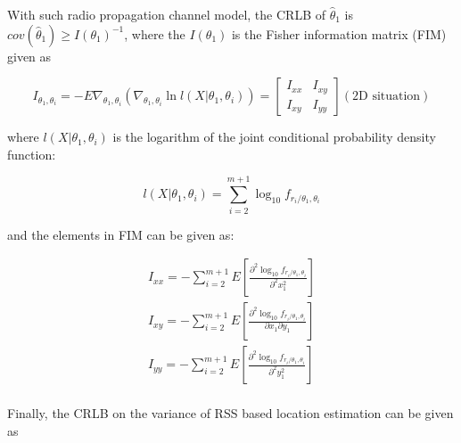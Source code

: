 \documentclass[12pt]{report}
\begin{document}
With such radio propagation channel model, the CRLB of $\hat{\theta}_1$ is $cov(\hat{\theta}_1) \geq I(\theta_1)^{-1}$, where the $I(\theta_1)$ is the Fisher information matrix (FIM) given as 

\begin{equation}
I_{\theta_1, \theta_i} = -E\nabla_{\theta_1, \theta_i}(\nabla_{\theta_1, \theta_i} \ln l (X|\theta_1,\theta_i)) = 
\begin{bmatrix}
I_{xx} & I_{xy} \\
I_{xy} & I_{yy}
\end{bmatrix}
(\textrm{2D situation})
\end{equation}

where $l(X|\theta_1,\theta_i)$ is the logarithm of the joint conditional probability density function:

\begin{equation}
l(X|\theta_1,\theta_i) = \sum^{m+1}_{i = 2} \log_{10} f_{r_i/ \theta_1,\theta_i}
\end{equation}

and the elements in FIM can be given as:

\begin{equation}
\begin{matrix}
I_{xx} = -\sum^{m+1}_{i=2} E[\frac{\partial^2 \log_{10} f_{r_i/ \theta_1,\theta_i} }{\partial^2 x^2_1}] \\
I_{xy} = -\sum^{m+1}_{i=2} E[\frac{\partial^2 \log_{10} f_{r_i/ \theta_1,\theta_i} }{\partial x_1 \partial y_1}] \\
I_{yy} = -\sum^{m+1}_{i=2} E[\frac{\partial^2 \log_{10} f_{r_i/ \theta_1,\theta_i} }{\partial^2 y^2_1}] \\
\end{matrix}
\end{equation}

Finally, the CRLB on the variance of RSS based location estimation can be given as
\end{document}
